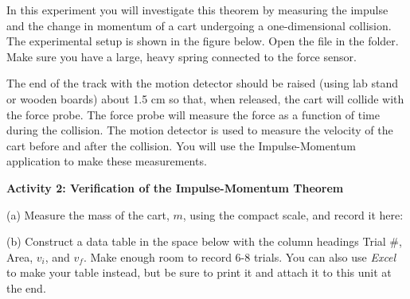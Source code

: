 In this experiment you will investigate this theorem by measuring the impulse
and the change in momentum of a cart undergoing a one-dimensional collision.
The experimental setup is shown in the figure below.
Open the file  in the \filename{\coursefolder} folder. 
Make sure you have a large, heavy spring connected to the force sensor.

The end of the track with the motion detector should be raised (using lab stand or wooden boards) 
about 1.5 cm so that, when released, the cart will collide with the force probe. 
The force probe will measure the force as a function of time during the collision. 
The motion detector is used to measure the velocity of the cart before and after the 
collision. You will use the Impulse-Momentum application to make these measurements.

\vspace{0.3cm}
{\par\centering {} \par}
\vspace{0.3cm}

\textbf{Activity 2: Verification of the Impulse-Momentum Theorem} 

(a) Measure the mass of the cart, $m$, using the compact scale, and record it here:
\vspace{10mm}

(b) Construct a data table in the space below with the column headings Trial
\#, Area, \( v_{i} \), and \( v_{f} \). Make enough room to record 6-8 trials.
You can also use {\it Excel} to make your table instead, but be sure to print it 
and attach it to this unit at the end.

